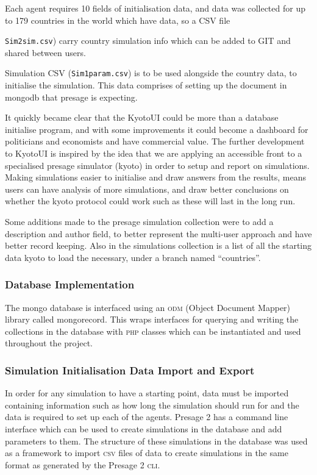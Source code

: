 Each agent requires 10 fields of initialisation data, and data was collected for up to 179 countries in the world which have data, so a CSV file {\texttt{Sim2sim.csv}) carry country simulation info which can be added to GIT and shared between users.

Simulation CSV (\texttt{Sim1param.csv}) is to be used alongside the country data, to initialise the simulation. This data comprises of setting up the document in mongodb that presage is expecting.

It quickly became clear that the KyotoUI could be more than a database initialise program, and with some improvements it could become a dashboard for politicians and economists and have commercial value. The further development to KyotoUI is inspired by the idea that we are applying an accessible front to a specialised presage simulator (kyoto) in order to setup and report on simulations. Making simulations easier to initialise and draw answers from the results, means users can have analysis of more simulations, and draw better conclusions on whether the kyoto protocol could work such as these will last in the long run.

Some additions made to the presage simulation collection were to add a description and author field, to better represent the multi-user approach and have better record keeping. Also in the simulations collection is a list of all the starting data kyoto to load the necessary, under a branch named “countries”.

\subsubsection{Database Implementation}

The mongo database is interfaced using an \textsc{odm} (Object Document Mapper) library called mongorecord. This wraps interfaces for querying and writing the collections in the database with \textsc{php} classes which can be instantiated and used throughout the project.

\subsubsection{Simulation Initialisation Data Import and Export}

In order for any simulation to have a starting point, data must be imported containing information such as how long the simulation should run for and the data is required to set up each of the agents. Presage 2 has a command line interface which can be used to create simulations in the database and add parameters to them. The structure of these simulations in the database was used as a framework to import \textsc{csv} files of data to create simulations in the same format as generated by the Presage 2 \textsc{cli}.

}
